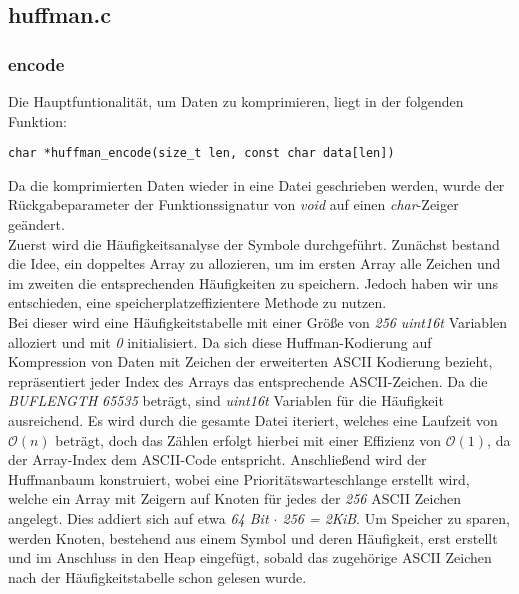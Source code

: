 \documentclass[course=erap]{aspdoc}
\begin{document}
\subsection{huffman.c}
\subsubsection{encode}
\label{sec:encode}

Die Hauptfuntionalität, um Daten zu komprimieren, liegt in der folgenden Funktion:

\begin{center}
    \begin{lstlisting}[frame=single, framerule=0pt, numbers=none]
        char *huffman_encode(size_t len, const char data[len])
    \end{lstlisting}
\end{center}
Da die komprimierten Daten wieder in eine Datei geschrieben werden, wurde der Rückgabeparameter der Funktionssignatur von \textit{void} auf einen \textit{char}-Zeiger geändert.\\
Zuerst wird die Häufigkeitsanalyse der Symbole durchgeführt. Zunächst bestand die Idee, ein doppeltes Array zu allozieren, um im ersten Array alle Zeichen und im zweiten die entsprechenden Häufigkeiten zu speichern. Jedoch haben wir uns entschieden, eine speicherplatzeffizientere Methode zu nutzen.\\
Bei dieser wird eine Häufigkeitstabelle mit einer Größe von \textit{256} \textit{uint16\textunderscore t} Variablen alloziert und mit \textit{0} initialisiert. Da sich diese Huffman-Kodierung auf Kompression von Daten mit Zeichen der erweiterten ASCII Kodierung bezieht, repräsentiert jeder Index des Arrays das entsprechende ASCII-Zeichen. Da die \textit{BUF\textunderscore LENGTH} \textit{65535} beträgt, sind \textit{uint16\textunderscore t} Variablen für die Häufigkeit ausreichend.
Es wird durch die gesamte Datei iteriert, welches eine Laufzeit von $\mathcal{O}(n)$ beträgt, doch das Zählen erfolgt hierbei mit einer Effizienz von $\mathcal{O}(1)$, da der Array-Index dem ASCII-Code entspricht.
Anschließend wird der Huffmanbaum konstruiert, wobei eine Prioritätswarteschlange erstellt wird, welche ein Array mit Zeigern auf Knoten für jedes der \textit{256} ASCII Zeichen angelegt. Dies addiert sich auf etwa \textit{64 Bit $\cdot$ 256 = 2KiB}. Um Speicher zu sparen, werden Knoten, bestehend aus einem Symbol und deren Häufigkeit, erst erstellt und im Anschluss in den Heap eingefügt, sobald das zugehörige ASCII Zeichen nach der Häufigkeitstabelle schon gelesen wurde.\\
\end{document}
